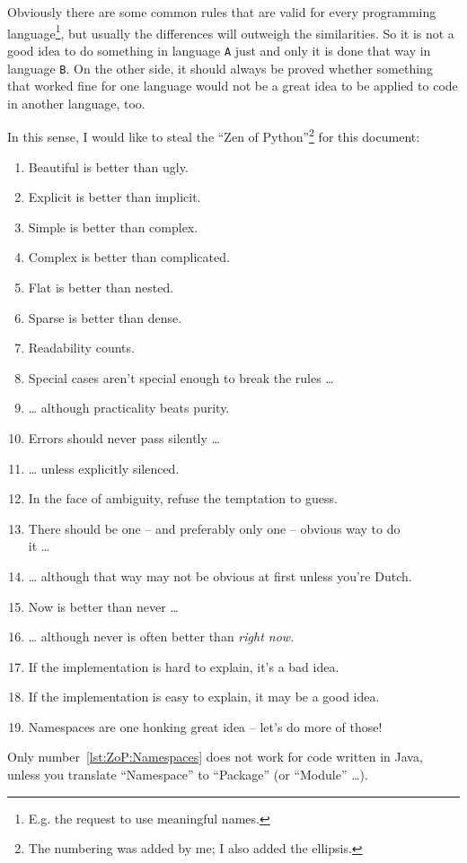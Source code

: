 Obviously there are some common rules that are valid for every programming language\footnote{E.g. the request to use meaningful names.}, but usually the differences will outweigh the similarities. So it is not a good idea to do something in language \verb#A# just and only it is done that way in language \verb#B#. On the other side, it should always be proved whether something that worked fine for one language would not be a great idea to be applied to code in another language, too.

In this sense, I would like to steal the “Zen of Python”\autocite{WIKIPEDIA:ZenOfPython,PYTHON_ORG_MAILING_LIST:ThePythonWay}\footnote{The numbering was added by me; I also added the ellipsis.} for this document:
\begin{enumerate}[nosep]
\item Beautiful is better than ugly.
\item Explicit is better than implicit.
\item Simple is better than complex.
\item Complex is better than complicated.
\item Flat is better than nested.
\item Sparse is better than dense.
\item Readability counts.
\item Special cases aren't special enough to break the rules …
\item … although practicality beats purity.
\item Errors should never pass silently …
\item … unless explicitly silenced.
\item In the face of ambiguity, refuse the temptation to guess.
\item There should be one – and preferably only one – obvious way to do\\ it …
\item … although that way may not be obvious at first unless you're Dutch.
\item Now is better than never …
\item … although never is often better than \textit{right now}.\item If the implementation is hard to explain, it's a bad idea.
\item If the implementation is easy to explain, it may be a good idea.
\item Namespaces are one honking great idea – let's do more of those!\label{lst:ZoP:Namespaces}
\end{enumerate}
Only number~\ref{lst:ZoP:Namespaces} does not work for code written in Java, unless you translate “Namespace” to “Package” (or “Module” …).

